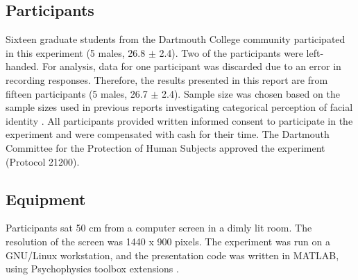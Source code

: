 \documentclass[10pt,letterpaper]{article}
\begin{document}
\bigskip

\subsection*{Participants}
Sixteen graduate students from the Dartmouth College community participated in this experiment (5 males, 26.8 $\pm$ 2.4). Two of the participants were left-handed. For analysis, data for one participant was discarded due to an error in recording responses. Therefore, the results presented in this report are from fifteen participants (5 males, 26.7 $\pm$ 2.4). Sample size was chosen based on the sample sizes used in previous reports investigating categorical perception of facial identity \cite{natu2016development, kaufmann2004expression, jacques2006speed, mckone2014face}. All participants provided written informed consent to participate in the experiment and were compensated with cash for their time. The Dartmouth Committee for the Protection of Human Subjects approved the experiment (Protocol 21200).  

\subsection*{Equipment}
Participants sat 50 cm from a computer screen in a dimly lit room. The resolution of the screen was 1440 x 900 pixels. The experiment was run on a GNU/Linux workstation, and the presentation code was written in MATLAB, using Psychophysics toolbox extensions \cite{brainard1997psychophysics, brainard1997spatial}.
\end{document}
